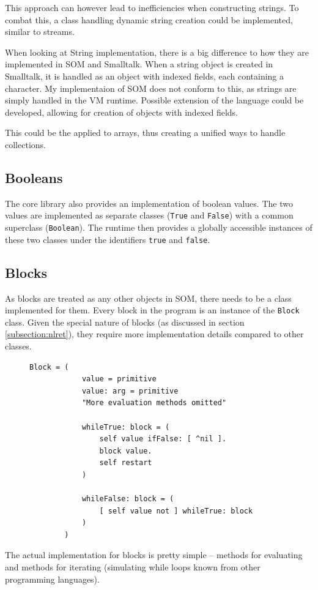 \documentclass[thesis=M,english]{FITthesis}[2019/12/23]
\begin{document}
This approach can however lead to inefficiencies when constructing strings. To combat this, a class handling dynamic string creation could
be implemented, similar to streams.

When looking at String implementation, there is a big difference to how they are implemented in SOM and Smalltalk. When a string object
is created in Smalltalk, it is handled as an object with indexed fields, each containing a character. My implementaion of SOM does not
conform to this, as strings are simply handled in the VM runtime. Possible extension of the language could be developed, allowing for
creation of objects with indexed fields.

This could be the applied to arrays, thus creating a unified ways to handle collections.

\subsection{Booleans}
The core library also provides an implementation of boolean values. The two values are implemented as separate classes (\texttt{True} and \texttt{False})
with a common superclass (\texttt{Boolean}). The runtime then provides a globally accessible instances of these two classes under the identifiers
\texttt{true} and \texttt{false}.

\subsection{Blocks}
As blocks are treated as any other objects in SOM, there needs to be a class implemented for them. Every block in the program is 
an instance of the \texttt{Block} class. Given the special nature of blocks (as discussed in section \ref{subsection:nlret}), they
require more implementation details compared to other classes.

\begin{figure}[h!]
	\centering
	\begin{lstlisting}[language=Smalltalk]
		Block = (
			value = primitive
			value: arg = primitive
			"More evaluation methods omitted"
			
			whileTrue: block = (
				self value ifFalse: [ ^nil ].
				block value.
				self restart
			)

			whileFalse: block = (
				[ self value not ] whileTrue: block
			)
		)
	\end{lstlisting}
\end{figure}

The actual implementation for blocks is pretty simple -- methods for evaluating and methods for iterating (simulating while loops known from
other programming languages).
\end{document}
